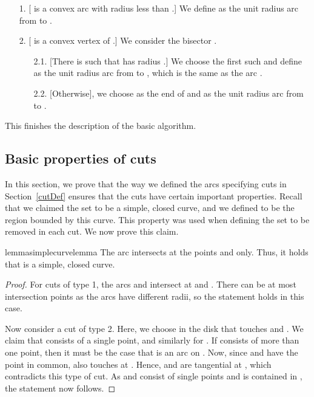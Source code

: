 \documentclass{article}
\begin{document}
\begin{enumerate}
\item[1.]
[ is a convex arc with radius less than .]
We define  as the unit radius arc from  to .

\item[2.]
[ is a convex vertex of .]
We consider the bisector .
 
\begin{enumerate}
\item[2.1.]
[There is  such that  has radius .]
We choose the first such  and define  as the unit radius arc from  to , which is the same as the arc .

\item[2.2.]
[Otherwise], we choose  as the end of  and  as the unit radius arc from  to .
\end{enumerate}
\end{enumerate}

This finishes the description of the basic algorithm.

\subsection{Basic properties of cuts}\label{sec:basicSimple}

In this section, we prove that the way we defined the arcs specifying cuts in Section~\ref{cutDef} ensures that the cuts have certain important  properties.
Recall that we claimed the set  to be a simple, closed curve, and we defined  to be the region bounded by this curve.
This property was used when defining the set  to be removed in each cut.
We now prove this claim.

\begin{restatable}{lemma}{simplecurvelemma}
\label{lem:simplecurve}
The arc  intersects  at the points  and  only.
Thus, it holds that  is a simple, closed curve.
\end{restatable}

\begin{proof}
For cuts of type 1, the arcs  and  intersect at  and .
There can be at most  intersection points as the arcs have different radii, so the statement holds in this case.

Now consider a cut of type 2.
Here, we choose  in the disk  that touches  and .
We claim that  consists of a single point, and similarly for .
If  consists of more than one point, then it must be the case that  is an arc on .
Now, since  and  have the point  in common,  also touches  at .
Hence,  and  are tangential at , which contradicts this type of cut.
As  and  consist of single points and  is contained in , the statement now follows.
\end{proof}
\end{document}
